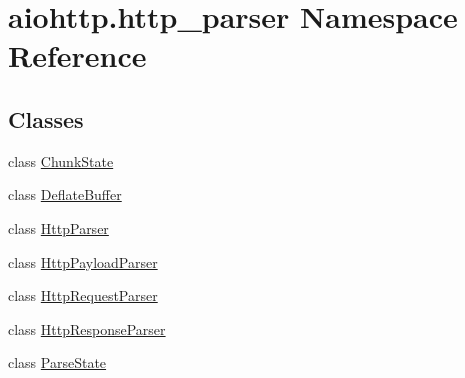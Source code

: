 \hypertarget{namespaceaiohttp_1_1http__parser}{}\section{aiohttp.\+http\+\_\+parser Namespace Reference}
\label{namespaceaiohttp_1_1http__parser}
\subsection*{Classes}
\begin{DoxyCompactItemize}
\item 
class \hyperlink{classaiohttp_1_1http__parser_1_1_chunk_state}{Chunk\+State}
\item 
class \hyperlink{classaiohttp_1_1http__parser_1_1_deflate_buffer}{Deflate\+Buffer}
\item 
class \hyperlink{classaiohttp_1_1http__parser_1_1_http_parser}{Http\+Parser}
\item 
class \hyperlink{classaiohttp_1_1http__parser_1_1_http_payload_parser}{Http\+Payload\+Parser}
\item 
class \hyperlink{classaiohttp_1_1http__parser_1_1_http_request_parser}{Http\+Request\+Parser}
\item 
class \hyperlink{classaiohttp_1_1http__parser_1_1_http_response_parser}{Http\+Response\+Parser}
\item 
class \hyperlink{classaiohttp_1_1http__parser_1_1_parse_state}{Parse\+State}
\end{DoxyCompactItemize}
